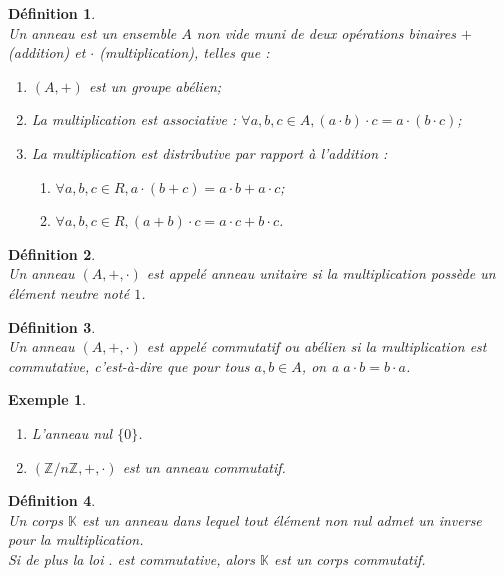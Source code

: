 \documentclass[a4paper, 14pt]{report}
\newtheorem{definition}{Définition}[section]
\newtheorem{example}{Exemple}[section]
\begin{document}
\begin{onehalfspace}
{			\begin{definition} \cite{lang2012algebra}\\
				Un anneau est un ensemble \( A \) non vide muni de deux opérations binaires \( + \) (addition) et \( \cdot \) (multiplication), telles que :
				\begin{enumerate} [label=\roman*)]
					\item \( (A, +) \) est un groupe abélien;
					\item La multiplication est associative : \(\forall a, b, c \in A, (a \cdot b) \cdot c = a \cdot (b \cdot c) \);
					\item La multiplication est distributive par rapport à l'addition :
					\begin{enumerate}
						\item \(\forall a, b, c \in R, a \cdot (b + c) = a \cdot b + a \cdot c \);
						\item \(\forall a, b, c \in R, (a + b) \cdot c = a \cdot c + b \cdot c \).
					\end{enumerate}
				\end{enumerate}
			\end{definition}
			
			\begin{definition} \cite{lang2012algebra}\\
				Un anneau \((A, +, \cdot)\) est appelé \emph{anneau unitaire} si la multiplication possède un élément neutre noté \( 1 \).
			\end{definition}
			
			
			\begin{definition} \cite{lang2012algebra}\\
				Un anneau \((A, +, \cdot)\) est appelé \emph{commutatif} ou \emph{abélien} si la multiplication est commutative, c'est-à-dire que pour tous \( a, b \in A \), on a \( a \cdot b = b \cdot a \).
			\end{definition}
			
			\begin{example} \
				\begin{enumerate}
					\item L’anneau nul \(\{0\}\).
					\item \((\mathbb{Z}/n\mathbb{Z}, +, \cdot)\) est un anneau commutatif.
				\end{enumerate}
			\end{example}
			
			
			\begin{definition} \cite{lang2012algebra}\\
				Un corps \(\mathbb{K}\) est un anneau dans lequel tout élément non nul admet un inverse pour la multiplication.\\
				Si de plus la loi $.$ est commutative, alors \(\mathbb{K}\) est un corps commutatif.
			\end{definition}
			
}
\end{onehalfspace}
\end{document}
